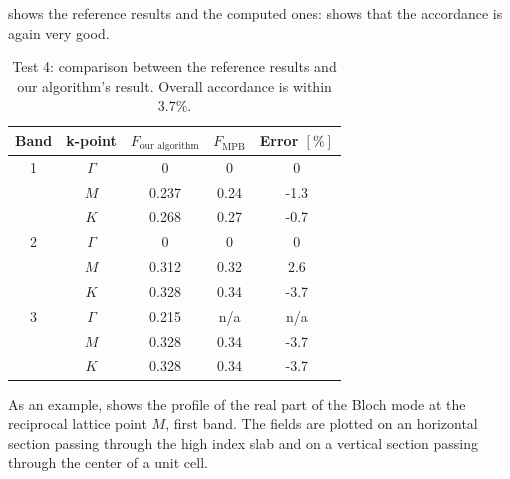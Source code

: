  shows the reference results and
 the computed ones:  shows
that the accordance is again very good.

\begin{table}[htbp]
  \begin{center}
    \begin{tabular}{*{5}{c}}
      \hline
      Band & k-point & $F_{\text{our algorithm}}$ & $F_{\text{MPB}}$ & Error $[\%]$ \\
      \hline
      1 & $\Gamma$ & 0 & 0 & 0 \\
        & $M$ & 0.237 & 0.24 & -1.3 \\
        & $K$ & 0.268 & 0.27 & -0.7 \\
      2 & $\Gamma$ & 0 & 0 & 0 \\
        & $M$ & 0.312 & 0.32 & 2.6 \\
        & $K$ & 0.328 & 0.34 & -3.7 \\
      3 & $\Gamma$ & 0.215 & n/a & n/a \\
        & $M$ & 0.328 & 0.34 & -3.7 \\
        & $K$ & 0.328 & 0.34 & -3.7 \\
      \hline
    \end{tabular}
  \end{center}
  \caption{Test 4: comparison between the reference results and our
  algorithm's result. Overall accordance is within $3.7\%$.}
  \label{tab:test_4}
\end{table}

As an example,  shows the profile of the real
part of the Bloch mode at the reciprocal lattice point $M$, first
band. The fields are plotted on an horizontal section passing through
the high index slab and on a vertical section passing through the
center of a unit cell.

